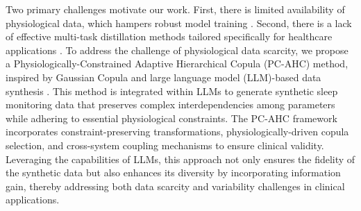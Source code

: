 \documentclass[preprint,12pt]{elsarticle}
\begin{document}
Two primary challenges motivate our work. First, there is limited availability of physiological data, which hampers robust model training \cite{li2025vigilance}. Second, there is a lack of effective multi-task distillation methods tailored specifically for healthcare applications \cite{yang2024survey1}. To address the challenge of physiological data scarcity, we propose a Physiologically-Constrained Adaptive Hierarchical Copula (PC-AHC) method, inspired by Gaussian Copula \cite{merrill2024transforming} and large language model (LLM)-based data synthesis \cite{gan2024towards}. This method is integrated within LLMs to generate synthetic sleep monitoring data that preserves complex interdependencies among parameters while adhering to essential physiological constraints. The PC-AHC framework incorporates constraint-preserving transformations, physiologically-driven copula selection, and cross-system coupling mechanisms to ensure clinical validity. Leveraging the capabilities of LLMs, this approach not only ensures the fidelity of the synthetic data but also enhances its diversity by incorporating information gain, thereby addressing both data scarcity and variability challenges in clinical applications.
\end{document}
